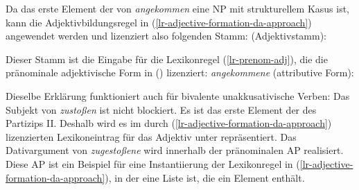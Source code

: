 {Da das erste Element der \subcatl von \emph{angekommen} eine NP mit strukturellem Kasus ist,
kann die Adjektivbildungsregel in (\ref{lr-adjective-formation-da-approach}) angewendet werden
und lizenziert also folgenden Stamm:
\eas
{} (Adjektivstamm):\\
\zs

\noindent
Dieser Stamm ist die Eingabe für die Lexikonregel (\ref{lr-prenom-adj}),
die die pränominale adjektivische Form in () lizenziert:
\eas
{\em angekommene} (attributive Form):\\
\zs

\noindent
Dieselbe Erklärung funktioniert auch für bivalente unakkusativische Verben:
\z
Das Subjekt von \emph{zustoßen} ist nicht blockiert.
Es ist das erste Element der \subcatl des Partizips II.
Deshalb wird es im durch (\ref{lr-adjective-formation-da-approach}) lizenzierten
Lexikoneintrag für das Adjektiv unter \subj repräsentiert.
Das Dativargument von \emph{zugestoßene} wird innerhalb der pränominalen AP realisiert.
Diese AP ist ein Beispiel für eine Instantiierung der Lexikonregel in (\ref{lr-adjective-formation-da-approach}),
in der  eine Liste ist, die ein Element enthält.

}
